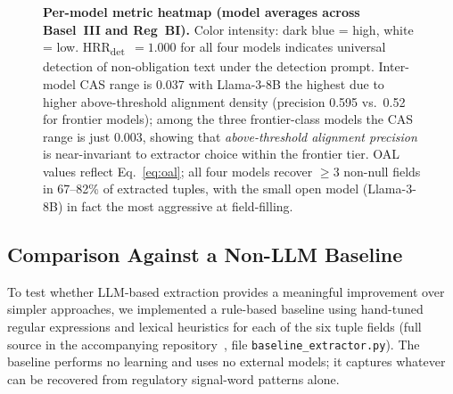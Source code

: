 \documentclass{article}
\begin{document}
\begin{figure}[!htbp]
\caption{\textbf{Per-model metric heatmap (model averages across Basel~III
and Reg~BI).}
Color intensity: dark blue = high, white = low.
HRR\textsubscript{det}~$=1.000$ for all four models indicates universal
detection of non-obligation text under the detection prompt.
Inter-model CAS range is 0.037 with Llama-3-8B the highest due to
higher above-threshold alignment density (precision 0.595 vs.\ 0.52
for frontier models); among the three frontier-class models the CAS
range is just 0.003, showing that \emph{above-threshold alignment
precision} is near-invariant to extractor choice within the
frontier tier.
OAL values reflect Eq.~\ref{eq:oal}; all four models recover $\geq 3$
non-null fields in 67--82\% of extracted tuples, with the small open
model (Llama-3-8B) in fact the most aggressive at field-filling.}
\label{fig:heatmap}
\end{figure}

\subsection{Comparison Against a Non-LLM Baseline}
\label{sec:baseline}

To test whether LLM-based extraction provides a meaningful improvement
over simpler approaches, we implemented a rule-based baseline using
hand-tuned regular expressions and lexical heuristics for each of the
six tuple fields (full source in the accompanying
repository~\cite{rigcode2025}, file
\texttt{baseline\_extractor.py}). The baseline performs no learning
and uses no external models; it captures whatever can be recovered
from regulatory signal-word patterns alone.
\end{document}
